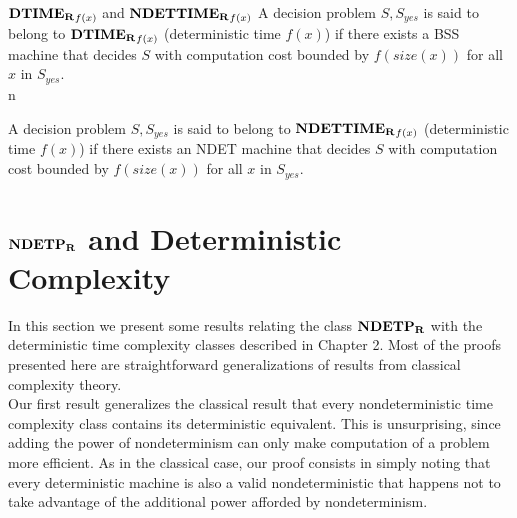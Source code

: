
\begin{definition} $\mathbf{DTIME_R}_{f(x)}$ and $\mathbf{NDETTIME_R}_{f(x)}$
  A decision problem $S, S_{yes}$ is said to belong to
  $\mathbf{DTIME_R}_{f(x)}$ (deterministic time $f(x)$) if there exists a BSS
  machine that decides $S$ with computation cost bounded by
  $f(size(x))$ for all $x$ in $S_{yes}$.  \\n
  
  A decision problem $S, S_{yes}$ is said to belong to
  $\mathbf{NDETTIME_R}_{f(x)}$ (deterministic time $f(x)$) if there exists an
  NDET machine that decides $S$ with computation cost bounded by
  $f(size(x))$ for all $x$ in $S_{yes}$.  \\
\end{definition}

\section{$\mathbf{NDETP_R}$ and Deterministic Complexity}

In this section we present some results relating the class $\mathbf{NDETP_R}$
with the deterministic time complexity classes described in Chapter 2.
Most of the proofs presented here are straightforward generalizations
of results from classical complexity theory.\\

Our first result generalizes the classical result that every
nondeterministic time complexity class contains its deterministic
equivalent.  This is unsurprising, since adding the power of
nondeterminism can only make computation of a problem more efficient.
As in the classical case, our proof consists in simply noting that
every deterministic machine is also a valid nondeterministic that
happens not to take advantage of the additional power afforded by
nondeterminism.



